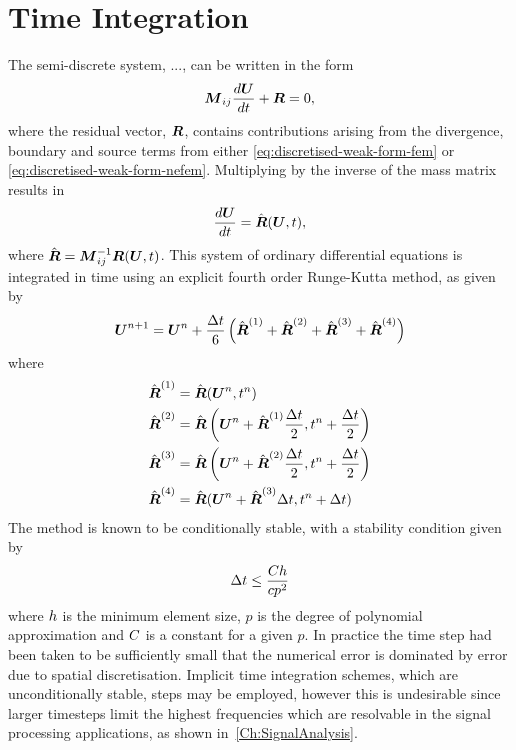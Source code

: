 
\section{Time Integration}
The semi-discrete system, ..., can be written in the form
$$
\boldsymbol{M}_{ij} \frac{d \boldsymbol{U}}{d t} + \boldsymbol{R} = 0 ,
$$
where the residual vector, $\boldsymbol{R}$, contains contributions arising from the divergence, boundary and source terms from either \eqref{eq:discretised-weak-form-fem} or \eqref{eq:discretised-weak-form-nefem}. Multiplying by the inverse of the mass matrix results in
$$
\frac{d \boldsymbol{U}}{d t} = \hat{\boldsymbol{R}}(\boldsymbol{U},t) ,
$$
where $\hat{\boldsymbol{R}} = \boldsymbol{M}_{ij}^{-1} \boldsymbol{R}(\boldsymbol{U},t)$.
This system of ordinary differential equations is integrated in time using an explicit fourth order Runge-Kutta method, as given by
$$
\boldsymbol{U}^{n+1} = \boldsymbol{U}^{n} + \frac{\Delta t}{6}
\left( 
  \hat{\boldsymbol{R}}^{(1)}
+  \hat{\boldsymbol{R}}^{(2)}
+  \hat{\boldsymbol{R}}^{(3)}
+  \hat{\boldsymbol{R}}^{(4)}
\right)
$$
where
\begin{align}
\hat{\boldsymbol{R}}^{(1)} &= \hat{\boldsymbol{R}}(\boldsymbol{U}^n,t^n) \\
\hat{\boldsymbol{R}}^{(2)} &= \hat{\boldsymbol{R}}
  \left( 
    \boldsymbol{U}^n + \hat{\boldsymbol{R}}^{(1)} \frac{\Delta t}{2},t^{n} + \frac{\Delta t}{2}
 \right) \\
\hat{\boldsymbol{R}}^{(3)} &= \hat{\boldsymbol{R}}
  \left( 
    \boldsymbol{U}^n + \hat{\boldsymbol{R}}^{(2)} \frac{\Delta t}{2},t^{n} + \frac{\Delta t}{2}
 \right) \\
\hat{\boldsymbol{R}}^{(4)} &= \hat{\boldsymbol{R}}(\boldsymbol{U}^n + \hat{\boldsymbol{R}}^{(3)} \Delta t,t^{n} + \Delta t) \\
\label{eq:3}
\end{align}
The method is known to be conditionally stable, with a stability condition given by
$$
\Delta t \le  \frac{ C h }{ c p^2}
$$
where $h$ is the minimum element size, $p$ is the degree of polynomial approximation and $C$ is a constant for a given $p$.
In practice the time step had been taken to be sufficiently small that the numerical error is dominated by error due to spatial discretisation. Implicit time integration schemes, which are unconditionally stable, steps may be employed, however this is undesirable since larger timesteps limit the highest frequencies which are resolvable in the signal processing applications, as shown in~\autoref{Ch:SignalAnalysis}.

